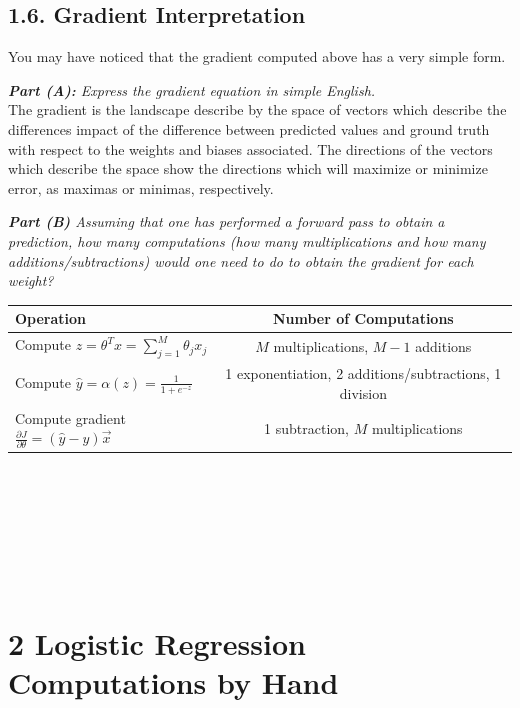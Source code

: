 \documentclass[11pt]{article}
\theoremstyle{plain}
\begin{document}
\subsection*{1.6. Gradient Interpretation }
You may have noticed that the gradient computed above has a very simple form.

\textit{\textbf{Part (A):} Express the gradient equation in simple English.}\vspace{0.1em} \\
The gradient is the landscape describe by the space of vectors which describe the differences impact of the difference between predicted values and ground truth with respect to the weights and biases associated. The directions of the vectors which describe the space show the directions which will maximize or minimize error, as maximas or minimas, respectively.

\textit{\textbf{Part (B)} Assuming that one has performed a forward pass to obtain a prediction, how many computations (how many multiplications and how many additions/subtractions) would one need to do to obtain the gradient for each weight?}\vspace{1em} \\
\begin{tabular}{|l|c|}
	\hline
	\textbf{Operation}                                                          & \textbf{Number of Computations}                        \\
	\hline
	Compute $z = \theta^T x = \sum_{j=1}^{M} \theta_j x_j$                      & $M$ multiplications, $M-1$ additions                   \\
	\hline
	Compute $\hat{y} = \alpha(z) = \frac{1}{1+e^{-z}}$                          & 1 exponentiation, 2 additions/subtractions, 1 division \\
	\hline
	Compute gradient $\frac{\partial J}{\partial \theta} = (\hat{y}-y) \vec{x}$ & 1 subtraction, $M$ multiplications                     \\
	\hline
\end{tabular} \\\\\\\\\\\

\section*{2 Logistic Regression Computations by Hand} 
\textbf{\textit{{\color{red}{ \begin{center} Refer to code, in attached zip file for adjustments (see "main-ec.py") \end{center} }}}} \vspace{1em}
\end{document}
